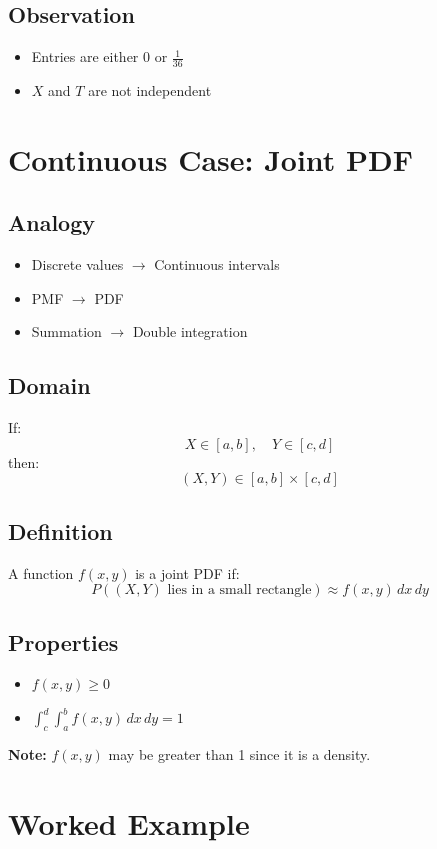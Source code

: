 \documentclass[12pt]{article}
\begin{document}
\subsection{Observation}
\begin{itemize}
    \item Entries are either $0$ or $\frac{1}{36}$
    \item $X$ and $T$ are not independent
\end{itemize}

\section{Continuous Case: Joint PDF}

\subsection{Analogy}
\begin{itemize}
    \item Discrete values $\rightarrow$ Continuous intervals
    \item PMF $\rightarrow$ PDF
    \item Summation $\rightarrow$ Double integration
\end{itemize}

\subsection{Domain}
If:
\[
X \in [a,b], \quad Y \in [c,d]
\]
then:
\[
(X,Y) \in [a,b] \times [c,d]
\]

\subsection{Definition}
A function $f(x,y)$ is a joint PDF if:
\[
P((X,Y) \text{ lies in a small rectangle}) \approx f(x,y)\,dx\,dy
\]

\subsection{Properties}
\begin{itemize}
    \item $f(x,y) \geq 0$
    \item $\int_c^d \int_a^b f(x,y)\,dx\,dy = 1$
\end{itemize}

\textbf{Note:} $f(x,y)$ may be greater than 1 since it is a density.

\section{Worked Example}
\end{document}
